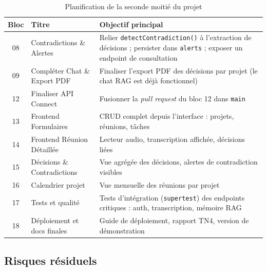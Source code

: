 \documentclass[12pt, a4paper]{article}
\begin{document}
\begin{table}[H]
\centering
\caption{Planification de la seconde moitié du projet}
\begin{tabularx}{\textwidth}{clX}
\toprule
\textbf{Bloc} & \textbf{Titre} & \textbf{Objectif principal} \\
\midrule
08 & Contradictions \& Alertes   & Relier \texttt{detectContradiction()} à l'extraction de décisions ; persister dans \texttt{alerts} ; exposer un endpoint de consultation \\
09 & Compléter Chat \& Export PDF & Finaliser l'export PDF des décisions par projet (le chat RAG est déjà fonctionnel) \\
12 & Finaliser API Connect       & Fusionner la \textit{pull request} du bloc 12 dans \texttt{main} \\
13 & Frontend Formulaires        & CRUD complet depuis l'interface : projets, réunions, tâches \\
14 & Frontend Réunion Détaillée  & Lecteur audio, transcription affichée, décisions liées \\
15 & Décisions \& Contradictions & Vue agrégée des décisions, alertes de contradiction visibles \\
16 & Calendrier projet           & Vue mensuelle des réunions par projet \\
17 & Tests et qualité            & Tests d'intégration (\texttt{supertest}) des endpoints critiques : auth, transcription, mémoire RAG \\
18 & Déploiement et docs finales & Guide de déploiement, rapport TN4, version de démonstration \\
\bottomrule
\end{tabularx}
\end{table}

\subsection{Risques résiduels}
\end{document}

